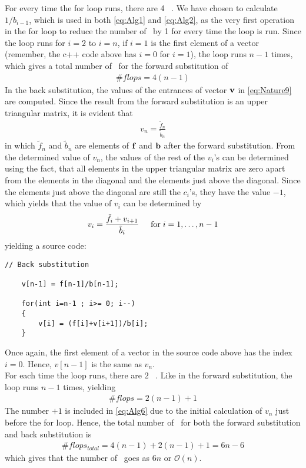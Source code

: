 For every time the for loop runs, there are 4 \flops\ . We have chosen to calculate $1/b_{i-1}$, which is used in both \eqref{eq:Alg1} and \eqref{eq:Alg2}, as the very first operation in the for loop to reduce the number of \flops \, by 1 for every time the loop is run. 
Since the loop runs for $i=2$ to $i=n$, if $i=1$ is the first element of a vector (remember, the c++ code above has $i=0$ for $i=1$), the loop runs $n-1$ times, which gives a total number of \flops \, for the forward substitution of
\begin{align}
	 \# flops = 4(n-1)
	 \label{eq:Alg3}
\end{align} 
In the back substitution, the values of the entrances of vector $\mbox{\textbf{v}}$ in \eqref{eq:Nature9} are computed. 
Since the result from the forward substitution is an upper triangular matrix, it is evident that
\begin{align}
	v_n = \frac{\tilde{f}_n}{\tilde{b}_n}  
	\label{eq:Alg4}
\end{align}
in which $\tilde{f}_n$ and $\tilde{b}_n$ are elements of $\mbox{\textbf{f}}$ and $\mbox{\textbf{b}}$ after the forward substitution. 
From the determined value of $v_n$, the values of the rest of the $v_i$'s can be determined using the fact, that all elements in the upper triangular matrix are zero apart from the elements in the diagonal and the elements just above the diagonal. 
Since the elements just above the diagonal are still the $c_i$'s, they have the value $-1$, which yields that the value of $v_i$ can be determined by 
\begin{align}
	v_i = \frac{\tilde{f}_i + v_{i+1}}{\tilde{b}_i} 
	\hspace{0.5cm} \mathrm{for} \hspace{0.1cm} i=1,\dots, n-1
	\label{eq:Alg5}
\end{align}
yielding a source code:
\begin{lstlisting}
// Back substitution

    v[n-1] = f[n-1]/b[n-1];

    for(int i=n-1 ; i>= 0; i--)
    {
        v[i] = (f[i]+v[i+1])/b[i];
    }
\end{lstlisting} 
Once again, the first element of a vector in the source code above has the index $i=0$. Hence, $v[n-1]$ is the same as $v_n$.
\\
For each time the loop runs, there are $2$ \flops\ . Like in the forward substitution, the loop runs $n-1$ times, yielding
\begin{align}
	 \# flops = 2(n-1)+1
	 \label{eq:Alg6}
\end{align} 
The number $+1$ is included in \eqref{eq:Alg6} due to the initial calculation of $v_n$ just before the for loop.
Hence, the total number of \flops \, for both the forward substitution and back substitution is
\begin{align}
	 \# flops_{total} = 4(n-1)+2(n-1)+1 = 6n-6 
	 \label{eq:Alg7}
\end{align}  
which gives that the number of \flops \, goes as $6n$ or $\mathcal{O}(n)$.

